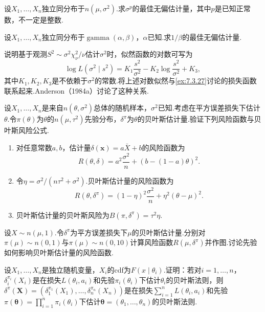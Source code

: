 \begin{exercise}\label{exercise:7.59}
设$X_1,\ldots,X_n$独立同分布于$n(\mu,\sigma^2)$.求$\sigma^p$的最佳无偏估计量，其中$p$是已知正常数，不一定是整数.
\end{exercise}
\begin{exercise}\label{exercise:7.60}
设$X_1,\ldots,X_n$独立同分布于$\operatorname{gamma}(\alpha,\beta)$，$\alpha$已知.求$1/\beta$的最佳无偏估计量.
\end{exercise}
\begin{exercise}\label{exercise:7.61}
说明基于观测$S^2\sim\sigma^2\chi_\nu^2/\nu$估计$\sigma^2$时，似然函数的对数可写为
$$\log L(\sigma^2\mid s^2)=K_1\frac{s^2}{\sigma^2}-K_2\log\frac{s^2}{\sigma^2}+K_3,$$
其中$K_1,K_2,K_3$是不依赖于$\sigma^2$的常数.将上述对数似然与\autoref{ex:7.3.27}讨论的损失函数联系起来.Anderson（1984a）讨论了这种关系.
\end{exercise}
\begin{exercise}\label{exercise:7.62}
设$X_1,\ldots,X_n$是来自$n(\theta,\sigma^2)$总体的随机样本，$\sigma^2$已知.考虑在平方误差损失下估计$\theta$.令$\pi(\theta)$为$\theta$的$n(\mu,\tau^2)$先验分布，$\delta^\pi$为$\theta$的贝叶斯估计量.验证下列风险函数与贝叶斯风险公式.
\begin{enumerate}[label=(\alph*)]
\item 对任意常数$a,b$，估计量$\delta(\boldsymbol x)=a\bar X+b$的风险函数为
$$R(\theta,\delta)=a^2\frac{\sigma^2}{n}+(b-(1-a)\theta)^2.$$
\item 令$\eta=\sigma^2/(n\tau^2+\sigma^2)$.贝叶斯估计量的风险函数为
$$R(\theta,\delta^\pi)=(1-\eta)^2\frac{\sigma^2}{n}+\eta^2(\theta-\mu)^2.$$
\item 贝叶斯估计量的贝叶斯风险为$B(\pi,\delta^\pi)=\tau^2\eta$.
\end{enumerate}
\end{exercise}
\begin{exercise}\label{exercise:7.63}
设$X\sim n(\mu,1)$.令$\delta^\pi$为平方误差损失下$\mu$的贝叶斯估计量.分别对$\pi(\mu)\sim n(0,1)$与$\pi(\mu)\sim n(0,10)$计算风险函数$R(\mu,\delta^\pi)$并作图.讨论先验如何影响贝叶斯估计量的风险函数.
\end{exercise}
\begin{exercise}\label{exercise:7.64}
设$X_1,\ldots,X_n$是独立随机变量，$X_i$的cdf为$F(x\mid\theta_i)$.证明：若对$i=1,\ldots,n$，$\delta_i^{\pi_i}(X_i)$是在损失$L(\theta_i,a_i)$和先验$\pi_i(\theta_i)$下估计$\theta_i$的贝叶斯法则，则$\delta^\pi(\boldsymbol X)=(\delta_1^{\pi_1}(X_1),\ldots,\delta_n^{\pi_n}(X_n))$是在损失$\sum_{i=1}^nL(\theta_i,a_i)$和先验$\pi(\boldsymbol\theta)=\prod_{i=1}^n\pi_i(\theta_i)$下估计$\boldsymbol\theta=(\theta_1,\ldots,\theta_n)$的贝叶斯法则.
\end{exercise}
